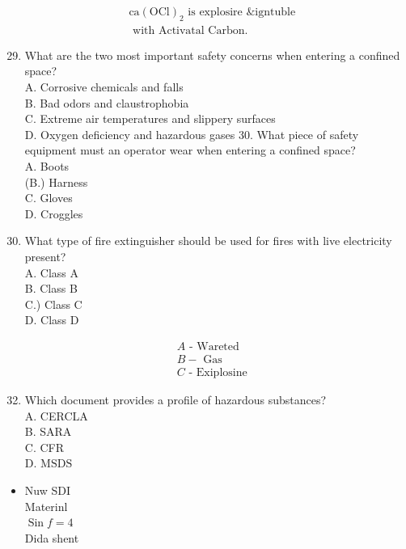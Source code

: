 \documentclass[10pt]{article}
\begin{document}
$$
\begin{aligned}
&\mathrm{ca}(\mathrm{OCl})_{2} \text { is explosire \& igntuble } \\
&\text { with Activatal Carbon. }
\end{aligned}
$$

\begin{enumerate}
  \setcounter{enumi}{28}
  \item What are the two most important safety concerns when entering a confined space?\\
A. Corrosive chemicals and falls\\
B. Bad odors and claustrophobia\\
C. Extreme air temperatures and slippery surfaces\\
D. Oxygen deficiency and hazardous gases 30. What piece of safety equipment must an operator wear when entering a confined space?\\
A. Boots\\
(B.) Harness\\
C. Gloves\\
D. Croggles

  \item What type of fire extinguisher should be used for fires with live electricity present?\\
A. Class A\\
B. Class B\\
C.) Class C\\
D. Class D

\end{enumerate}

$$
\begin{aligned}
&A \text { - Wareted } \\
&B-\text { Gas } \\
&C \text { - Exiplosine }
\end{aligned}
$$

\begin{enumerate}
  \setcounter{enumi}{31}
  \item Which document provides a profile of hazardous substances?\\
A. CERCLA\\
B. SARA\\
C. CFR\\
D. $\mathrm{MSDS}$
\end{enumerate}

\begin{itemize}
  \item Nuw SDI\\
Materinl\\
$\operatorname{Sin} f=4$\\
Dida shent
\end{itemize}
\end{document}
